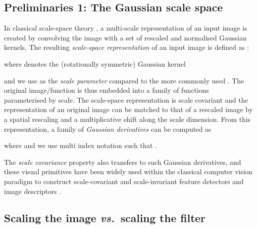 \documentclass[twocolumn,runningheads]{svjour3}
\begin{document}
\subsection{Preliminaries 1: The Gaussian scale space}
\label{sec:gauss-prel}

In classical scale-space theory 
\cite{Iij62,Wit83,Koe84,KoeDoo92-PAMI,Lin93-Dis,Lin94-SI,Flo97-book,WeiIshImi99-JMIV,Haa04-book,DuiFloGraRom04-JMIV,Lin10-JMIV},
a multi-scale representation of an input image is created by
convolving the image with a set of rescaled and normalised Gaussian
kernels. The resulting {\em scale-space representation\/}
of an input image  is defined as
\cite{Lin93-Dis}:

where  denotes the (rotationally symmetric) Gaussian kernel

and we use  as the {\em scale parameter} compared to the
more commonly used . The original image/function is thus embedded into a family of functions parameterised by scale. The scale-space representation is scale covariant and the representation of an original image can be matched to that of a rescaled image by a spatial rescaling and a multiplicative shift along the scale dimension.
From this representation, a family of {\em Gaussian derivatives} can
be computed as

where  and we use multi index notation 
 such that
. 

The \emph{scale covariance} property also transfers to such Gaussian derivatives, and 
these visual primitives have been widely used within the classical
computer vision paradigm to construct scale-covariant and
scale-invariant feature detectors and image descriptors
\cite{Lin97-IJCV,Lin98-IJCV,BL97-CVIU,ChoVerHalCro00-ECCV,MikSch04-IJCV,Low04-IJCV,BayEssTuyGoo08-CVIU,TuyMik08-Book,Lin13-ImPhys,Lin15-JMIV}. 

\subsection{Scaling the image {\em vs.\/}\ scaling the filter}
\label{sec:scaling-image-v-filter}
\end{document}
